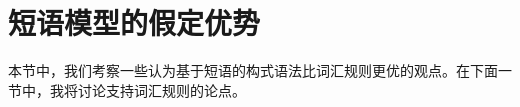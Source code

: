 
\section{短语模型的假定优势}
\label{Abschnitt-Stoepselei}
%

    本节中，我们考察一些认为基于短语的构式语法比词汇规则更优的观点。在下面一节中，我将讨论支持词汇规则的论点。

